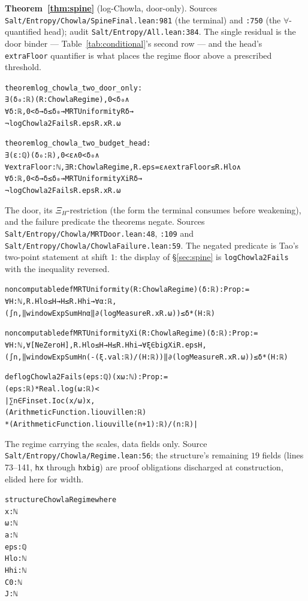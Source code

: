 \documentclass{CUP-JNL-FMP}
\newcommand{\leaninline}[1]{{\small\texttt{#1}}}
\theoremstyle{remark}
\begin{document}
\medskip\noindent\textbf{Theorem~\ref{thm:spine}} (log-Chowla, door-only).
Sources \leaninline{Salt/Entropy/Chowla/SpineFinal.lean:981} (the terminal) and
\leaninline{:750} (the $\forall$-quantified head); audit
\leaninline{Salt/Entropy/All.lean:384}. The single residual is the door binder ---
Table~\ref{tab:conditional}'s second row --- and the head's
\leaninline{extraFloor} quantifier is what places the regime floor above a
prescribed threshold.
{\footnotesize\begin{alltt}
theorem log_chowla_two_door_only :
    ∃ (δ₀ : ℝ) (R : ChowlaRegime), 0 < δ₀ ∧
      ∀ δ : ℝ, 0 < δ → δ ≤ δ₀ → MRTUniformity R δ →
        ¬ logChowla2Fails R.eps R.x R.ω

theorem log_chowla_two_budget_head :
    ∃ (ε : ℚ) (δ₀ : ℝ), 0 < ε ∧ 0 < δ₀ ∧
      ∀ extraFloor : ℕ, ∃ R : ChowlaRegime, R.eps = ε ∧ extraFloor ≤ R.Hlo ∧
        ∀ δ : ℝ, 0 < δ → δ ≤ δ₀ → MRTUniformityXi R δ →
          ¬ logChowla2Fails R.eps R.x R.ω
\end{alltt}}

\noindent The door, its $\Xi_H$-restriction (the form the terminal consumes
before weakening), and the failure predicate the theorems negate. Sources
\leaninline{Salt/Entropy/Chowla/MRTDoor.lean:48}, \leaninline{:109} and
\leaninline{Salt/Entropy/Chowla/ChowlaFailure.lean:59}. The negated predicate is
Tao's two-point statement at shift $1$: the display of \S\ref{sec:spine} is
\leaninline{logChowla2Fails} with the inequality reversed.
{\footnotesize\begin{alltt}
noncomputable def MRTUniformity (R : ChowlaRegime) (δ : ℝ) : Prop :=
  ∀ H : ℕ, R.Hlo ≤ H → H ≤ R.Hhi → ∀ α : ℝ,
    (∫ n, ‖windowExpSum H n α‖ ∂(logMeasure R.x R.ω)) ≤ δ * (H : ℝ)

noncomputable def MRTUniformityXi (R : ChowlaRegime) (δ : ℝ) : Prop :=
  ∀ H : ℕ, ∀ [NeZero H], R.Hlo ≤ H → H ≤ R.Hhi → ∀ ξ ∈ bigXi R.eps H,
    (∫ n, ‖windowExpSum H n (-(ξ.val : ℝ) / (H : ℝ))‖ ∂(logMeasure R.x R.ω)) ≤ δ * (H : ℝ)

def logChowla2Fails (eps : ℚ) (x ω : ℕ) : Prop :=
  (eps : ℝ) * Real.log (ω : ℝ) <
    |∑ n ∈ Finset.Ioc (x / ω) x,
      (ArithmeticFunction.liouville n : ℝ)
        * (ArithmeticFunction.liouville (n + 1) : ℝ) / (n : ℝ)|
\end{alltt}}

\noindent The regime carrying the scales, data fields only. Source
\leaninline{Salt/Entropy/Chowla/Regime.lean:56}; the structure's remaining $19$
fields (lines 73--141, \leaninline{hx} through \leaninline{hxbig}) are proof
obligations discharged at construction, elided here for width.
{\footnotesize\begin{alltt}
structure ChowlaRegime where
  x : ℕ
  ω : ℕ
  a : ℕ
  eps : ℚ
  Hlo : ℕ
  Hhi : ℕ
  C0 : ℕ
  J : ℕ
\end{alltt}}
\end{document}
